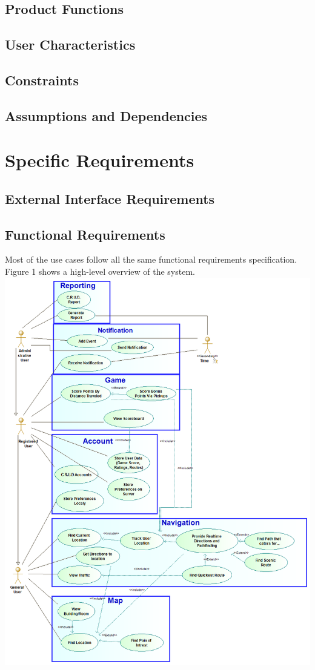 \documentclass{article}
\begin{document}
		\subsection{Product Functions}
    	\subsection{User Characteristics}    
    	\subsection{Constraints}   
    	\subsection{Assumptions and Dependencies}

	\section{Specific Requirements}
    
    	\subsection{External Interface Requirements}
    	\subsection{Functional Requirements}
    	
    	Most of the use cases follow all the same functional requirements specification. Figure 1 shows a high-level overview of the system. \\
    	\includegraphics[width=\textwidth]{System_Use_Case_Diagram}
    	
\end{document}

